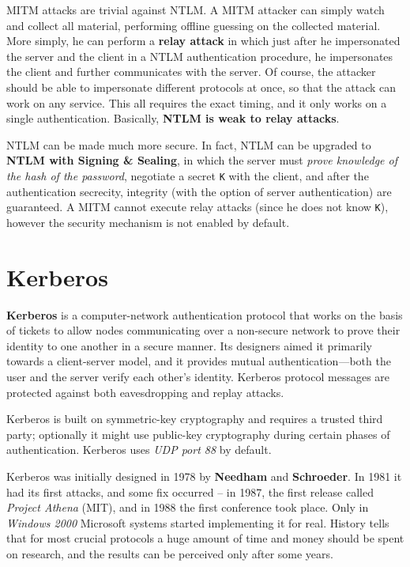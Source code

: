 \documentclass[10pt]{extreport}
\begin{document}
MITM attacks are trivial against NTLM. A MITM attacker can simply watch and
collect all material, performing offline guessing on the collected material.
More simply, he can perform a \textbf{relay attack} in which just after he
impersonated the server and the client in a NTLM authentication procedure, he
impersonates the client and further communicates with the server. Of course,
the attacker should be able to impersonate different protocols at once, so that
the attack can work on any service. This all requires the exact timing, and it
only works on a single authentication. Basically, \textbf{NTLM is weak to relay
attacks}.

NTLM can be made much more secure. In fact, NTLM can be upgraded to
\textbf{NTLM with Signing \& Sealing}, in which the server must \emph{prove
knowledge of the hash of the password}, negotiate a secret \texttt{K} with the
client, and after the authentication secrecity, integrity (with the option of
server authentication) are guaranteed. A MITM cannot execute relay attacks
(since he does not know \texttt{K}), however the security mechanism is not
enabled by default.

\section{Kerberos}
\textbf{Kerberos} is a computer-network authentication protocol that
works on the basis of tickets to allow nodes communicating over a non-secure
network to prove their identity to one another in a secure manner. Its
designers aimed it primarily towards a client-server model, and it provides mutual
authentication—both the user and the server verify each other's identity.
Kerberos protocol messages are protected against both eavesdropping and replay
attacks.

Kerberos is built on symmetric-key cryptography and requires a trusted third
party; optionally it might use public-key cryptography during certain phases of
authentication. Kerberos uses \emph{UDP port 88} by default.

Kerberos was initially designed in 1978 by \textbf{Needham} and
\textbf{Schroeder}. In 1981 it had its first attacks, and some fix occurred --
in 1987, the first release called \emph{Project Athena} (MIT), and in 1988 the
first conference took place. Only in \emph{Windows 2000} Microsoft systems
started implementing it for real. History tells that for most crucial protocols
a huge amount of time and money should be spent on research, and the results
can be perceived only after some years.
\end{document}
